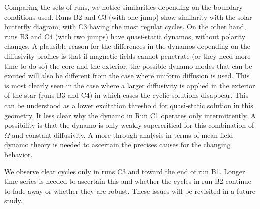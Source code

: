 \documentclass[baaa]{baaa}
\begin{document}
Comparing the sets of runs, we notice similarities depending on the boundary conditions used. 
 Runs B2 and C3 (with one jump) show similarity with the solar butterfly diagram, with C3 having the most regular cycles.
On the other hand, runs B3 and C4 (with two jumps) have quasi-static dynamos, without polarity changes.
A plausible reason for the differences in the dynamos depending on the diffusivity profiles is that if magnetic fields cannot penetrate (or they need more time to do so) the core and the exterior, the possible dynamo modes that can be excited will also be different from the case where uniform diffusion is used. This is most clearly seen in the case where a larger diffusivity is applied in the exterior of the star (runs B3 and C4) in which cases the cyclic solutions disappear. This can be understood as a lower excitation threshold for quasi-static solution in this geometry. It less clear why the dynamo in Run C1 operates only intermittently. A possibility is that the dynamo is only weakly supercritical for this combination of $\Omega$ and constant diffusivity. A more through analysis in terms of mean-field dynamo theory is needed to ascertain the precises causes for the changing behavior.

 We observe clear cycles only in runs C3 and toward the end of run B1. Longer time series is needed to ascertain this and whether the cycles in run B2 continue to fade away or whether they are robust. These issues will be revisited in a future study.

\end{document}
